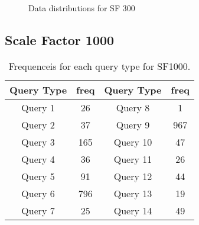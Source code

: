 \begin{figure}[H]
\begin{center}
  \caption{Data distributions for SF 300}
  \label{fig:datadistSF300}
\end{center}
\end{figure}

\subsection{Scale Factor 1000}

\begin{table}[H]
\centering
    \begin{tabular}{|c|c|c|c|}
    \hline
    Query Type & freq & Query Type & freq \\ 
    \hline
    \hline
    Query 1 & 26 & Query 8 & 1 \\ 
    \hline       
    Query 2 & 37 & Query 9 & 967 \\  
    \hline        
    Query 3 & 165 & Query 10 & 47 \\ 
    \hline       
    Query 4 & 36 & Query 11 &  26 \\ 
    \hline        
    Query 5 & 91 & Query 12 &  44 \\ 
    \hline        
    Query 6 & 796 & Query 13 &  19 \\  
    \hline        
    Query 7 & 25 & Query 14 &  49 \\ 
    \hline
    \end{tabular}
    \caption{Frequenceis for each query type for SF1000.}
    \label{table:freqs_sf1000}
\end{table}

